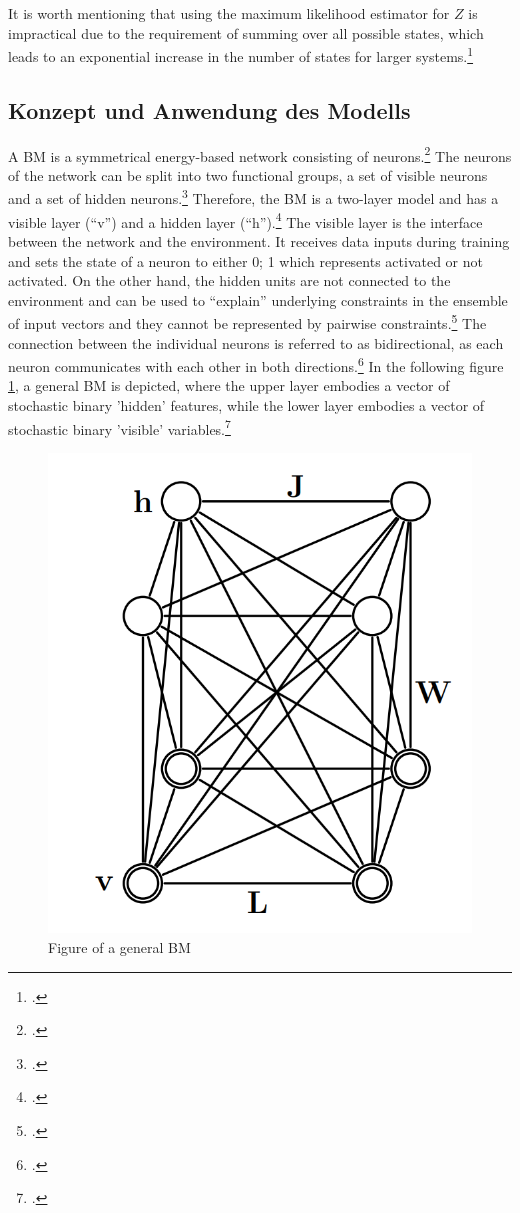 It is worth mentioning that using the maximum likelihood estimator for \( Z \) is impractical due to the requirement of summing over all possible states, which leads to an exponential increase in the number of states for larger systems.\footcite[Vgl.][2-3]{zhaiDeepStructuredEnergy2016}


\subsection{Konzept und Anwendung des Modells}

A \ac{BM} is a symmetrical energy-based network consisting of neurons.\footcite[Vgl.][260]{amariInformationGeometryBoltzmann1992}
The neurons of the network can be split into two functional groups, a set of visible neurons and a set of hidden neurons.\footcite[Vgl.][154]{ackleyLearningAlgorithmBoltzmann1985}
Therefore, the \ac{BM} is a two-layer model and has a visible layer (``v'') and a hidden layer (``h'').\footcite[Vgl.][448]{salakhutdinovDeepBoltzmannMachines2009}
The visible layer is the interface between the network and the environment. It receives data inputs during training and sets the state of a neuron to either {0; 1} which represents activated or not activated.
On the other hand, the hidden units are not connected to the environment and can be used to “explain” underlying constraints in the ensemble of input vectors and they cannot be represented by pairwise constraints.\footcite[Vgl.][154]{ackleyLearningAlgorithmBoltzmann1985}
The connection between the individual neurons is referred to as bidirectional, as each neuron communicates with each other in both directions.\footcite[Vgl.][149]{ackleyLearningAlgorithmBoltzmann1985}
In the following figure \ref{fig1}, a general \ac{BM} is depicted, where the upper layer embodies a vector of stochastic binary 'hidden' features, while the lower layer embodies a vector of stochastic binary 'visible' variables.\footcite[Vgl.][449]{salakhutdinovDeepBoltzmannMachines2009}

\begin{figure}[H]
    \centering
    \includegraphics[width=0.25\linewidth]{graphics/General_BM.png}
    \caption{Figure of a general \ac{BM}}
    \label{fig1}
\end{figure}

